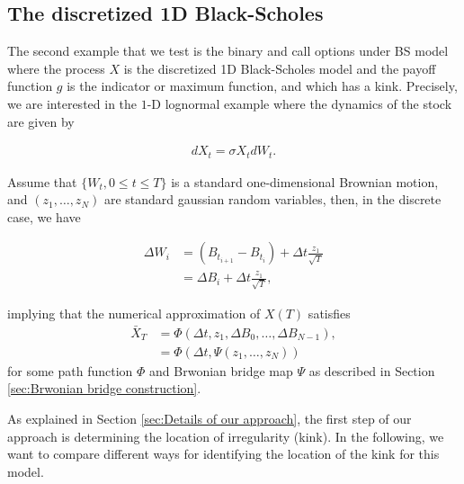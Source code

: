 \documentclass[11pt]{article}
\begin{document}
\subsection{The discretized 1D Black-Scholes}\label{sec:The discretized 1D Black-Scholes}

The second example that we test is the binary and  call options under BS model where the process $X$ is the discretized 1D Black-Scholes model and the payoff function $g$ is the indicator or maximum function, and which has a kink. Precisely, we are interested in the  $1$-D lognormal example where the dynamics of the stock are given by

\begin{align}\label{lognormal_dynamics}
	dX_t=\sigma X_t dW_t.
\end{align}


Assume that $\{W_t, 0 \leq t \leq T\} $ is a standard one-dimensional Brownian motion, and $(z_1,\dots,z_N)$ are standard gaussian random variables, then, in the discrete case, we have

\begin{align}\label{Brownian_bridge_BS_1D}
	\Delta W_i&=(B_{t_{i+1}}-B_{t_i})+\Delta t \frac{z_1}{\sqrt{T}} \nonumber\\
	&= \Delta B_i + \Delta t \frac{z_1}{\sqrt{T}},
\end{align}

implying that the numerical approximation of $X(T)$ satisfies
\begin{align}
	\bar{X}_T&=\Phi(\Delta t, z_1, \Delta B_0,\dots,\Delta B_{N-1}), \\ \nonumber
	&=\Phi(\Delta t, \Psi(z_1,\dots,z_N))
\end{align}
for some path function $\Phi$ and Brwonian bridge map $\Psi$ as described in Section \ref{sec:Brwonian bridge construction}.




As explained in Section \ref{sec:Details of our approach}, the first step of our approach is determining the location of irregularity (kink). In the following, we want to compare different ways for identifying the location of the kink for this model.
\end{document}
